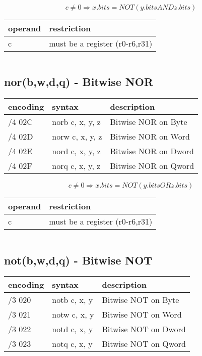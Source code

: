 \documentclass[letterpaper,10pt,openright,twoside,onecolumn]{book}
\begin{document}
  \begin{displaymath} c \neq 0 \Rightarrow x.bits = NOT(y.bits AND z.bits)\end{displaymath}

  \flushleft
  \begin{tabular}{|l|l|}
   \hline
    operand & restriction \\
   \hline
    c & must be a register (r0-r6,r31) \\
   \hline
  \end{tabular}
  \begin{verbatim}
  \end{verbatim}

\newpage\subsection{nor(b,w,d,q) - Bitwise NOR}
  \begin{tabular}{|l|l|l|}
   \hline
    encoding & syntax & description \\
   \hline
    /4 02C & norb c, x, y, z & Bitwise NOR on Byte \\
    /4 02D & norw c, x, y, z & Bitwise NOR on Word \\
    /4 02E & nord c, x, y, z & Bitwise NOR on Dword \\
    /4 02F & norq c, x, y, z & Bitwise NOR on Qword \\
   \hline
  \end{tabular}

  \begin{displaymath} c \neq 0 \Rightarrow x.bits = NOT(y.bits OR z.bits)\end{displaymath}

  \flushleft
  \begin{tabular}{|l|l|}
   \hline
    operand & restriction \\
   \hline
    c & must be a register (r0-r6,r31) \\
   \hline
  \end{tabular}
  \begin{verbatim}
  \end{verbatim}

\newpage\subsection{not(b,w,d,q) - Bitwise NOT}
  \begin{tabular}{|l|l|l|}
   \hline
    encoding & syntax & description \\
   \hline
    /3 020 & notb c, x, y & Bitwise NOT on Byte \\
    /3 021 & notw c, x, y & Bitwise NOT on Word \\
    /3 022 & notd c, x, y & Bitwise NOT on Dword \\
    /3 023 & notq c, x, y & Bitwise NOT on Qword \\
   \hline
  \end{tabular}
\end{document}
